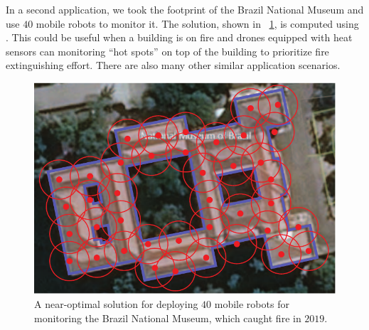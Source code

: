 In a second application, we took the footprint of the Brazil 
National Museum and use $40$ mobile robots to monitor it. The solution,
shown in ~\ref{fig:osg-museum}, is computed using \orgtilp. This could be
useful when a building is on fire and drones equipped with heat sensors 
can monitoring ``hot spots'' on top of the building to prioritize fire 
extinguishing effort. There are also many other similar application 
scenarios. 

\begin{figure}[ht]
    \centering
    \includegraphics[width=0.95\columnwidth]{chapters/osg/figures/museum-eps-converted-to.pdf}
		\vspace*{1mm}
    \caption{A near-optimal solution for deploying $40$ mobile robots for 
		monitoring the Brazil National Museum, which caught fire in $2019$.}
    \label{fig:osg-museum}
\end{figure}